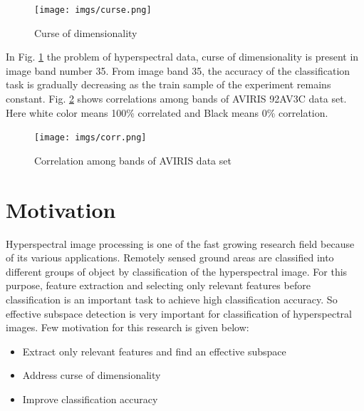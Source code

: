 \documentclass[document.tex]{subfiles}
\begin{document}
\begin{figure}[H]
\begin{center}
	\texttt{[image: imgs/curse.png]}
\end{center}
\caption{Curse of dimensionality\cite{9}}
\label{fig:Curse of dimensionality}
\end{figure}
\noindent In Fig. \ref{fig:Curse of dimensionality} the problem of hyperspectral data, curse of dimensionality is present in image band number 35. From image band 35, the accuracy of the classification task is gradually decreasing as the train sample of the experiment remains constant. Fig. \ref{fig:Correlation among bands of AVIRIS data set} shows correlations among bands of AVIRIS 92AV3C data set. Here white color means 100\% correlated and Black means 0\% correlation.
\begin{figure}[H]
	\begin{center}
		\texttt{[image: imgs/corr.png]}
	\end{center}
	\caption{Correlation among bands of AVIRIS data set}
	\label{fig:Correlation among bands of AVIRIS data set}
\end{figure}
\section{Motivation}
\noindent Hyperspectral image processing is  one of the fast growing research field because of its various applications. Remotely sensed ground areas are classified into different groups of object by classification of the hyperspectral image. For this purpose, feature extraction and selecting only relevant features before classification is an important task to achieve high classification accuracy. So effective subspace detection is very important for classification of hyperspectral images. Few motivation for this research is given below:
\begin{itemize}
	\item Extract only relevant features and find an effective subspace
	\item Address curse of dimensionality\cite{1}
	\item Improve classification accuracy
\end{itemize}
\end{document}
